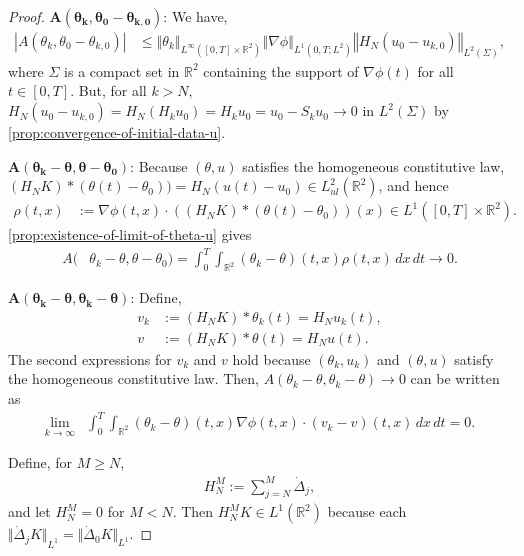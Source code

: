 \documentclass[11pt,reqno,xcolor=svgnames]{amsart}
\def\R{{\mathbb R}}
\theoremstyle{plain}
\theoremstyle{definition}
\theoremstyle{plain}
\theoremstyle{remark}
\newcommand{\abs}[1]{\left\vert#1\right\vert}
\newcommand{\iny}{\ensuremath{\infty}}
\newcommand{\grad}{\ensuremath{\nabla}}
\newcommand{\norm}[1]{\ensuremath{\left\Vert #1 \right\Vert}}
\newcommand{\smallnorm}[1]{\ensuremath{\Vert #1 \Vert}}
\newcommand{\Del}{\dot{\Delta}}
\begin{document}
\begin{proof}
	\smallskip\noindent$\boldsymbol{A(\theta_k,
		\theta_0 - \theta_{k, 0})}$:
	We have,
	\begin{align*}
		\abs{A(\theta_k, \theta_0 - \theta_{k, 0})}
			&\le \norm{\theta_k}_{L^\iny([0, T] \times \R^2)}
				\norm{\grad \phi}_{L^1(0, T; L^2)}
				\norm{H_N(u_0 - u_{k, 0})}_{L^2(\Sigma)},
	\end{align*}
	where $\Sigma$ is a compact set in $\R^2$ containing the support of $\grad \phi(t)$ for all $t \in [0, T]$. But, for all $k > N$, $H_N (u_0 - u_{k,0}) = H_N(H_k u_0) = H_k u_0 = u_0 - S_k u_0 \to 0$ in $L^2(\Sigma)$ by \cref{prop:convergence-of-initial-data-u}.

    \smallskip\noindent$\boldsymbol{A(\theta_k - \theta,
    	\theta - \theta_0)}$:
    Because $(\theta, u)$ satisfies the homogeneous constitutive law,  $(H_N K) * (\theta(t) - \theta_0)) = H_N (u(t) - u_0) \in L^2_{ul}(\R^2)$, and hence
	\begin{align*}
		\rho(t, x)
			&:= \grad \phi(t,x) \cdot
            	((H_N K) * (\theta(t) - \theta_0))(x)
			\in L^1([0, T] \times \R^2).
	\end{align*}
	\cref{prop:existence-of-limit-of-theta-u} gives
	\begin{align*}
		A(&\theta_k - \theta, \theta - \theta_0)
			= \int_0^T\int_{\R^2} (\theta_k - \theta) (t, x)
				\rho(t, x)
            \, dx \, dt
            \to 0.
	\end{align*}

    \smallskip\noindent$\boldsymbol{A(\theta_k - \theta,
    	\theta_k - \theta)}$:
    Define,
    \begin{align*}
        v_k
            &:= (H_N K) * \theta_k(t)
            = H_N u_k(t), \\
        v &
            := (H_N K) * \theta(t)
            = H_N u(t).
    \end{align*}
    The second expressions for $v_k$ and $v$ hold because $(\theta_k, u_k)$ and $(\theta, u)$ satisfy the homogeneous constitutive law.
	Then, $A(\theta_k - \theta, \theta_k - \theta) \to 0$ can
	be written as
    \begin{align}\label{e:KeyNonFinal}
         \lim_{k \to \iny} &\int_0^T \int_{\R^2}
         	(\theta_k - \theta)(t,x)
            \nabla\phi(t,x) \cdot (v_k - v)(t, x)
                \, dx \, dt
            = 0.
    \end{align}
    
    Define, for $M \ge N$,
    \begin{align}\label{e:HNM}
        H_N^M := \sum_{j = N}^M \Del_j,
    \end{align}
    and let $H_N^M = 0$ for $M < N$. Then $H_N^M K \in L^1(\R^2)$ because each $\smallnorm{\Del_j K}_{L^1} = \smallnorm{\Del_0 K}_{L^1}$.


\end{proof}
\end{document}
